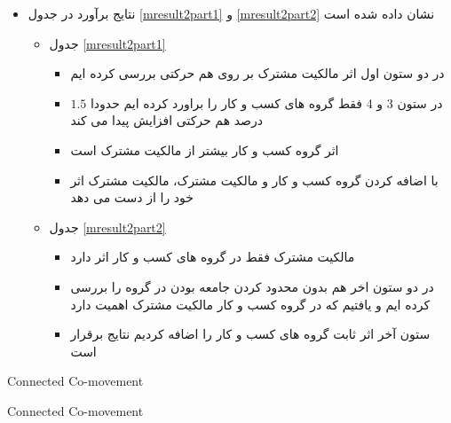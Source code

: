 \documentclass[12pt, a4paper]{article}
\begin{document}
\begin{itemize}
	\item 
	نتایج برآورد در جدول 
	\ref{mresult2part1}
	و
	\ref{mresult2part2}
	نشان داده شده است
	
\begin{itemize}
\item
جدول
\ref{mresult2part1}
\begin{itemize}

	\item 
	در دو ستون اول  اثر مالکیت مشترک بر روی هم حرکتی بررسی کرده ایم
	\item 
		در ستون 3 و 4 فقط گروه های کسب و کار را براورد کرده ایم حدودا $1.5$ درصد هم حرکتی افزایش پیدا می کند
	\item 
	اثر گروه کسب و کار بیشتر از مالکیت مشترک است
	\item 
	با اضافه کردن گروه کسب و کار و مالکیت مشترک، مالکیت مشترک اثر خود را از دست می دهد
\end{itemize}
	
\item
جدول
\ref{mresult2part2}
\begin{itemize}
	\item 
	مالکیت مشترک فقط در گروه های کسب و کار اثر دارد
	\item
	در دو ستون اخر هم بدون محدود کردن جامعه بودن در گروه را بررسی کرده ایم و یافتیم که در گروه کسب و کار مالکیت مشترک اهمیت دارد
	\item
	ستون آخر اثر ثابت گروه های کسب و کار را اضافه کردیم نتایج برقرار است
\end{itemize}
	
\end{itemize} 
\end{itemize}

	{\begin{table}[p]
	\centering
	\caption{Connected Co-movement}
	\label{mresult2part1}
	\resizebox{1\textwidth}{!}{
		\begin{LTR}
			\lr{}
		\end{LTR}
	}
\end{table}}

	{\begin{table}[p]
	\centering
	\caption{Connected Co-movement}
	\label{mresult2part2}
	\resizebox{1\textwidth}{!}{
		\begin{LTR}
			\lr{}
		\end{LTR}
	}
\end{table}}
\end{document}
